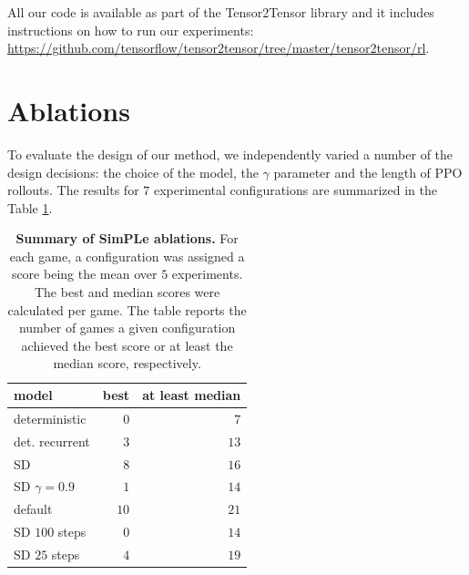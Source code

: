 
All our code is available as part of the Tensor2Tensor library and it includes instructions on
how to run our experiments: \url{https://github.com/tensorflow/tensor2tensor/tree/master/tensor2tensor/rl}.

\section{Ablations}\label{sec:ablations}

To evaluate the design of our method, we independently varied a number of the design decisions: the choice of the model, the $\gamma$ parameter and the length of PPO rollouts. The results for $7$ experimental configurations are summarized in the Table \ref{tab:count_best_models}.

\begin{table}
\caption{\textbf{Summary of SimPLe ablations.} For each game, a configuration was assigned a score being the mean over $5$ experiments. The best and median scores were calculated per game. The table reports the number of games a given configuration achieved the best score or at least the median score, respectively.}
\begin{center}
  \begin{tabular}{lrr}\label{tab:ab}
model  &  best &  at least median \\
\midrule
deterministic       &     $0$ &                $7$ \\
det. recurrent  &     $3$ &               $13$ \\
SD         &     $8$ &               $16$ \\
SD $\gamma=0.9$     &     $1$ &               $14$ \\
default     &     $10$ &               $21$ \\
SD $100$ steps    &     $0$ &               $14$ \\
SD $25$ steps     &     $4$ &               $19$ \\
\bottomrule
\end{tabular} 
\end{center}
\label{tab:count_best_models}
\end{table}

